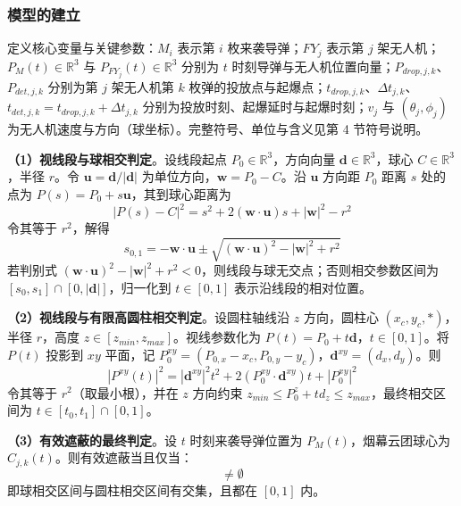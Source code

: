 \subsubsection{模型的建立}

定义核心变量与关键参数：$M_i$ 表示第 $i$ 枚来袭导弹；$FY_j$ 表示第 $j$ 架无人机；$P_M(t) \in \mathbb{R}^3$ 与 $P_{FY_j}(t) \in \mathbb{R}^3$ 分别为 $t$ 时刻导弹与无人机位置向量；$P_{drop,j,k}$、$P_{det,j,k}$ 分别为第 $j$ 架无人机第 $k$ 枚弹的投放点与起爆点；$t_{drop,j,k}$、$\Delta t_{j,k}$、$t_{det,j,k} = t_{drop,j,k} + \Delta t_{j,k}$ 分别为投放时刻、起爆延时与起爆时刻；$v_j$ 与 $(\theta_j, \phi_j)$ 为无人机速度与方向（球坐标）。完整符号、单位与含义见第 4 节符号说明。

\textbf{（1）视线段与球相交判定}。设线段起点 $P_0 \in \mathbb{R}^3$，方向向量 $\mathbf{d} \in \mathbb{R}^3$，球心 $C \in \mathbb{R}^3$，半径 $r$。令 $\mathbf{u} = \mathbf{d} / |\mathbf{d}|$ 为单位方向，$\mathbf{w} = P_0 - C$。沿 $\mathbf{u}$ 方向距 $P_0$ 距离 $s$ 处的点为 $P(s) = P_0 + s \mathbf{u}$，其到球心距离为
\begin{equation}
|P(s) - C|^2 = s^2 + 2(\mathbf{w} \cdot \mathbf{u})s + |\mathbf{w}|^2 - r^2
\end{equation}
令其等于 $r^2$，解得
\begin{equation}
s_{0,1} = -\mathbf{w} \cdot \mathbf{u} \pm \sqrt{(\mathbf{w} \cdot \mathbf{u})^2 - |\mathbf{w}|^2 + r^2}
\end{equation}
若判别式 $(\mathbf{w} \cdot \mathbf{u})^2 - |\mathbf{w}|^2 + r^2 < 0$，则线段与球无交点；否则相交参数区间为 $[s_0, s_1] \cap [0, |\mathbf{d}|]$，归一化到 $t \in [0, 1]$ 表示沿线段的相对位置。

\textbf{（2）视线段与有限高圆柱相交判定}。设圆柱轴线沿 $z$ 方向，圆柱心 $(x_c, y_c, *)$，半径 $r$，高度 $z \in [z_{min}, z_{max}]$。视线参数化为 $P(t) = P_0 + t \mathbf{d}$，$t \in [0, 1]$。将 $P(t)$ 投影到 $xy$ 平面，记 $P_0^{xy} = (P_{0,x} - x_c, P_{0,y} - y_c)$，$\mathbf{d}^{xy} = (d_x, d_y)$。则
\begin{equation}
|P^{xy}(t)|^2 = |\mathbf{d}^{xy}|^2 t^2 + 2(P_0^{xy} \cdot \mathbf{d}^{xy})t + |P_0^{xy}|^2
\end{equation}
令其等于 $r^2$（取最小根），并在 $z$ 方向约束 $z_{min} \le P_0^z + t d_z \le z_{max}$，最终相交区间为 $t \in [t_0, t_1] \cap [0, 1]$。

\textbf{（3）有效遮蔽的最终判定}。设 $t$ 时刻来袭导弹位置为 $P_M(t)$，烟幕云团球心为 $C_{j,k}(t)$。则有效遮蔽当且仅当：
\begin{equation}
[T_{smoke,\min}(P_M, C_{j,k}) \cap T_{cyl}(P_M, O_{true})] \neq \emptyset
\end{equation}
即球相交区间与圆柱相交区间有交集，且都在 $[0, 1]$ 内。

